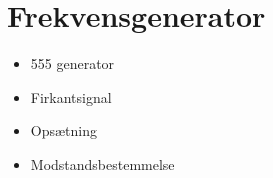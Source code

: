 \section{Frekvensgenerator}\label{sec:sec_frekvensgen}
\begin{itemize}
	\item 555 generator
	\item Firkantsignal
	\item Opsætning 
	\item Modstandsbestemmelse
\end{itemize}